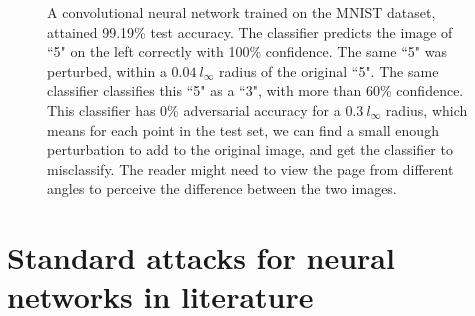 \documentclass{ociamthesis}
\begin{document}
\begin{figure}[!h]
    \centering
    \qquad
     \caption{A
    convolutional neural network trained on the MNIST dataset, attained 99.19\%
    test accuracy. The classifier predicts the image of ``5" on the left
    correctly with 100\% confidence. The same ``5" was perturbed, within a
    $0.04~l_\infty$ radius of the original ``5". The same classifier classifies
    this ``5" as a ``3", with more than 60\% confidence. This classifier has 0\%
    adversarial accuracy for a $0.3~l_\infty$ radius, which means for each point
    in the test set, we can find a small enough perturbation to add to the
    original image, and get the classifier to misclassify. The reader might need
    to view the page from different angles to perceive the difference between
    the two images.}
    \label{fig:adversarial-example-5}
\end{figure}

\section{Standard attacks for neural networks in literature}
\label{section:standard-attacks}
\end{document}
